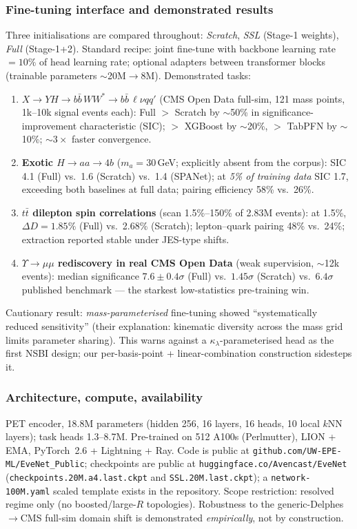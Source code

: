 \documentclass[11pt]{article}
\newcommand{\kl}{\ensuremath{\kappa_\lambda}}
\begin{document}
\subsubsection{Fine-tuning interface and demonstrated results}
Three initialisations are compared throughout: \emph{Scratch},
\emph{SSL} (Stage-1 weights), \emph{Full} (Stage-1+2). Standard recipe:
joint fine-tune with backbone learning rate $=10\%$ of head learning rate;
optional adapters between transformer blocks (trainable parameters
$\sim$20M$\to$8M). Demonstrated tasks:
\begin{enumerate}[label=(\alph*)]
\item \textbf{$X\to YH\to b\bar b\,WW^*\to b\bar b\,\ell\nu qq'$}
  (CMS Open Data full-sim, 121 mass points, 1k--10k signal events each):
  Full $>$ Scratch by $\sim$50\% in significance-improvement characteristic
  (SIC); $>$ XGBoost by $\sim$20\%, $>$ TabPFN by $\sim$10\%;
  $\sim3\times$ faster convergence.
\item \textbf{Exotic $H\to aa\to 4b$} ($m_a=30$\,GeV; explicitly absent from
  the corpus): SIC 4.1 (Full) vs.\ 1.6 (Scratch) vs.\ 1.4 (SPANet); at
  \emph{5\% of training data} SIC 1.7, exceeding both baselines at full
  data; pairing efficiency 58\% vs.\ 26\%.
\item \textbf{$t\bar t$ dilepton spin correlations} (scan 1.5\%--150\% of
  2.83M events): at 1.5\%, $\Delta D = 1.85\%$ (Full) vs.\ 2.68\% (Scratch);
  lepton--quark pairing 48\% vs.\ 24\%; extraction reported stable under
  JES-type shifts.
\item \textbf{$\Upsilon\to\mu\mu$ rediscovery in real CMS Open Data} (weak
  supervision, $\sim$12k events): median significance $7.6\pm0.4\sigma$
  (Full) vs.\ $1.45\sigma$ (Scratch) vs.\ $6.4\sigma$ published benchmark
  --- the starkest low-statistics pre-training win.
\end{enumerate}
Cautionary result: \emph{mass-parameterised} fine-tuning showed
``systematically reduced sensitivity'' (their explanation: kinematic
diversity across the mass grid limits parameter sharing). This warns
against a \kl-parameterised head as the first NSBI design; our
per-basis-point + linear-combination construction sidesteps it.

\subsubsection{Architecture, compute, availability}
PET encoder, 18.8M parameters (hidden 256, 16 layers, 16 heads, 10 local
$k$NN layers); task heads 1.3--8.7M. Pre-trained on 512 A100s (Perlmutter),
LION + EMA, PyTorch~2.6 + Lightning + Ray. Code is public at
\texttt{github.com/UW-EPE-ML/EveNet\_Public}; checkpoints are public at
\texttt{huggingface.co/Avencast/EveNet}
(\texttt{checkpoints.20M.a4.last.ckpt} and \texttt{SSL.20M.last.ckpt});
a \texttt{network-100M.yaml} scaled template
exists in the repository. Scope restriction: resolved regime only (no
boosted/large-$R$ topologies). Robustness to the generic-Delphes$\to$CMS
full-sim domain shift is demonstrated \emph{empirically}, not by
construction.
\end{document}
